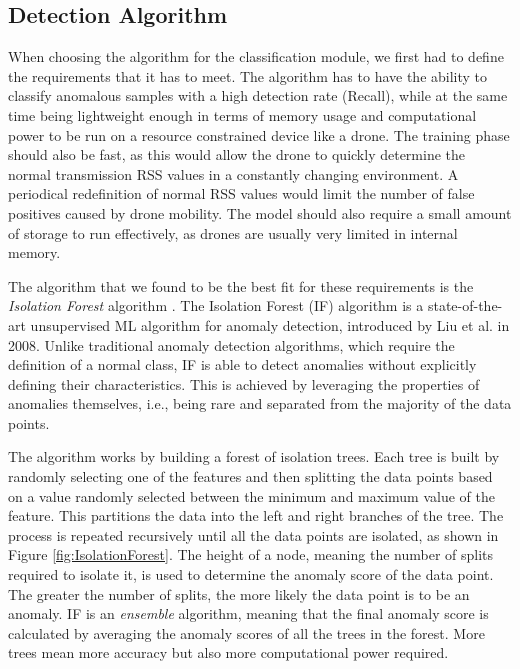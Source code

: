 \documentclass[futureinternet,article,submit,pdftex,moreauthors]{Definitions/mdpi}
\begin{document}
\subsection {Detection Algorithm}

When choosing the algorithm for the classification module, we first had to define the requirements that it has to meet. The algorithm has to have the ability to classify anomalous samples with a high detection rate (Recall), while at the same time 
being lightweight enough in terms of memory usage and computational power to be run on a resource constrained device like a drone. The training phase should also be fast, as this would allow the drone to quickly determine the normal transmission RSS values in a constantly changing environment. A periodical redefinition of normal RSS values would 
limit the number of false positives caused by drone mobility. 
The model should also require a small amount of storage to run effectively, as drones are usually very limited in internal memory. 

The algorithm that we found to be the best fit for these requirements is the \textit{Isolation Forest} algorithm \cite{IsolationForestLiu}. The Isolation Forest (IF) algorithm is a state-of-the-art unsupervised ML algorithm for anomaly detection, introduced by Liu et al. in 2008. 
Unlike traditional anomaly detection algorithms, which require the definition of a normal class, IF is able to detect anomalies without explicitly defining their characteristics.
This is achieved by leveraging the properties of anomalies themselves, i.e., being rare and separated from the majority of the data points. 

The algorithm works by building a forest of isolation trees. Each tree is built by randomly selecting one of the features and then splitting the data points based on a value randomly selected between the minimum and maximum value of the feature. This partitions the data into the 
left and right branches of the tree. The process is repeated recursively until all the data points are isolated, as shown in Figure \ref{fig:IsolationForest}. The height of a node, meaning the number of splits required to isolate it, is used to determine the anomaly score of the data point. The greater the number of splits, the more likely the data point is to be an anomaly.
IF is an \textit{ensemble} algorithm, meaning that the final anomaly score is calculated by averaging the anomaly scores of all the trees in the forest. More trees mean more accuracy but also more computational power required.
\end{document}
